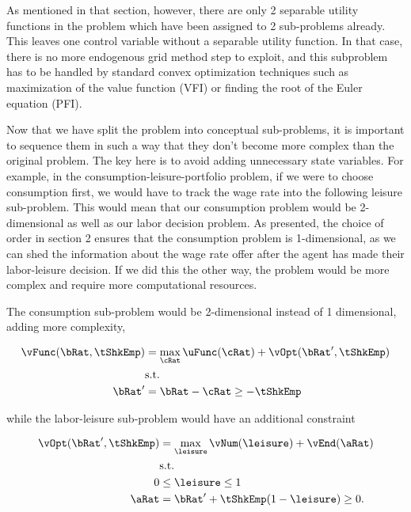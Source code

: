 \documentclass[\econtexRoot/SequentialEGM]{subfiles}
\begin{document}
As mentioned in that section, however, there are only 2 separable utility functions in the problem which have been assigned to 2 sub-problems already. This leaves one control variable without a separable utility function. In that case, there is no more endogenous grid method step to exploit, and this subproblem has to be handled by standard convex optimization techniques such as maximization of the value function (VFI) or finding the root of the Euler equation (PFI).

Now that we have split the problem into conceptual sub-problems, it is important to sequence them in such a way that they don't become more complex than the original problem. The key here is to avoid adding unnecessary state variables. For example, in the consumption-leisure-portfolio problem, if we were to choose consumption first, we would have to track the wage rate into the following leisure sub-problem. This would mean that our consumption problem would be 2-dimensional as well as our labor decision problem. As presented, the choice of order in section 2 ensures that the consumption problem is 1-dimensional, as we can shed the information about the wage rate offer after the agent has made their labor-leisure decision. If we did this the other way, the problem would be more complex and require more computational resources.

The consumption sub-problem would be 2-dimensional instead of 1 dimensional, adding more complexity,

\begin{equation}
    \begin{split}
        \vFunc(\bRat, \tShkEmp) & = \max_{\cRat} \uFunc(\cRat) + \vOpt(\bRat', \tShkEmp) \\
        & \text{s.t.}\\
        \bRat' & = \bRat - \cRat \ge - \tShkEmp
    \end{split}
\end{equation}

while the labor-leisure sub-problem would have an additional constraint


\begin{equation}
    \begin{split}
        \vOpt(\bRat', \tShkEmp) & = \max_{\leisure} \vNum(\leisure) + \vEnd(\aRat) \\
        & \text{s.t.} \\
        0 & \le \leisure \le 1 \\
        \aRat & = \bRat' + \tShkEmp(1 - \leisure) \ge 0.
    \end{split}
\end{equation}
\end{document}
